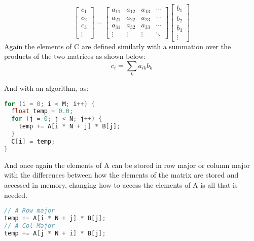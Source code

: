 \documentclass[a4paper]{article}
\begin{document}
\[
\begin{bmatrix}
    c_{1} \\
    c_{2} \\
    c_{3} \\
    \vdots  
\end{bmatrix} 
=
\begin{bmatrix}
    a_{11}  &  a_{12} & a_{13} & \cdots  \\
    a_{21}  &  a_{22} & a_{23} & \cdots  \\
    a_{31}  &  a_{32} & a_{33} & \cdots  \\
    \vdots & \vdots & \vdots & \ddots 
\end{bmatrix}
\begin{bmatrix}
    b_{1}  \\
    b_{2}  \\
    b_{3}  \\
    \vdots
\end{bmatrix}
\]
Again the elements of C are defined similarly with a summation over the products of the two matrices as shown below:
\begin{equation*}
c_{i} = \sum_{k} a_{ik}b_{k}
\end{equation*}

And with an algorithm, as:

\begin{lstlisting}[language=C++]
for (i = 0; i < M; i++) {
  float temp = 0.0;
  for (j = 0; j < N; j++) {
    temp += A[i * N + j] * B[j];
  }
  C[i] = temp;
}
\end{lstlisting}

And once again the elements of A can be stored in row major or column major with the differences between how the elements of the matrix are stored and accessed in memory, changing how to access the elements of A is all that is needed.

\begin{lstlisting}[language=C++]
// A Row major
temp += A[i * N + j] * B[j];
// A Col Major
temp += A[j * N + i] * B[j];
\end{lstlisting}
\end{document}
